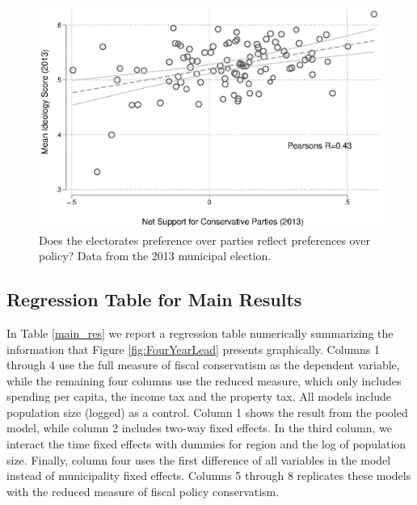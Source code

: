 \documentclass[a4paper,12pt]{article}
\begin{document}
\begin{figure}[htbp]
	\includegraphics[width=1\textwidth]{validation1.eps}
	\caption{Does the electorates preference over parties reflect preferences over policy? Data from the 2013 municipal election.} \label{validation1}
\end{figure}  
\clearpage

\subsection{Regression Table for Main Results}

\setcounter{table}{0}
\setcounter{figure}{0}


In Table \ref{main_res} we report a regression table numerically summarizing the information that Figure \ref{fig:FourYearLead} presents graphically. Columns 1 through 4 use the full measure of fiscal conservatism as the dependent variable, while the remaining four columns use the reduced measure, which only includes spending per capita, the income tax and the property tax. All models include population size (logged) as a control. Column 1 shows the result from the pooled model, while column 2 includes two-way fixed effects. In the third column, we interact the time fixed effects with dummies for region and the log of population size. Finally, column four uses the first difference of all variables in the model instead of municipality fixed effects. Columns 5 through 8 replicates these models with the reduced measure of fiscal policy conservatism. 
\end{document}
